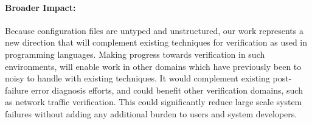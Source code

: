 \paragraph{Broader Impact:} 
Because configuration files are untyped and unstructured, our work represents a new direction that will complement existing techniques for verification as used in programming languages. 
Making progress towards verification in such environments, will enable work in other domains which have previously been to noisy to handle with existing techniques.
It would complement existing post-failure error diagnosis efforts, and could benefit other verification domains, such as network traffic verification. 
This could significantly reduce large scale system failures without adding any additional burden to users and system developers. 


